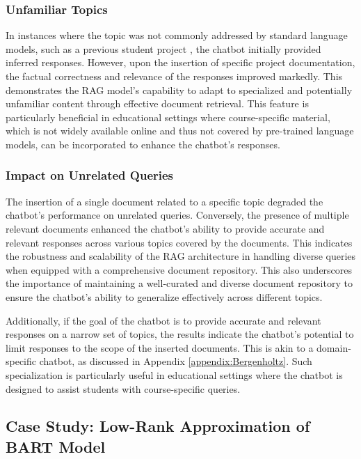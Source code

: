 \subsubsection{Unfamiliar Topics}

In instances where the topic was not commonly addressed by standard language models, such as a previous student project \cite{PGL}, the chatbot initially provided inferred responses. However, upon the insertion of specific project documentation, the factual correctness and relevance of the responses improved markedly. This demonstrates the RAG model's capability to adapt to specialized and potentially unfamiliar content through effective document retrieval. This feature is particularly beneficial in educational settings where course-specific material, which is not widely available online and thus not covered by pre-trained language models, can be incorporated to enhance the chatbot's responses.

\subsubsection{Impact on Unrelated Queries}

The insertion of a single document related to a specific topic degraded the chatbot's performance on unrelated queries. Conversely, the presence of multiple relevant documents enhanced the chatbot's ability to provide accurate and relevant responses across various topics covered by the documents. This indicates the robustness and scalability of the RAG architecture in handling diverse queries when equipped with a comprehensive document repository. This also underscores the importance of maintaining a well-curated and diverse document repository to ensure the chatbot's ability to generalize effectively across different topics.

Additionally, if the goal of the chatbot is to provide accurate and relevant responses on a narrow set of topics, the results indicate the chatbot's potential to limit responses to the scope of the inserted documents. This is akin to a domain-specific chatbot, as discussed in Appendix \ref{appendix:Bergenholtz}. Such specialization is particularly useful in educational settings where the chatbot is designed to assist students with course-specific queries.

\subsection{Case Study: Low-Rank Approximation of BART Model}

